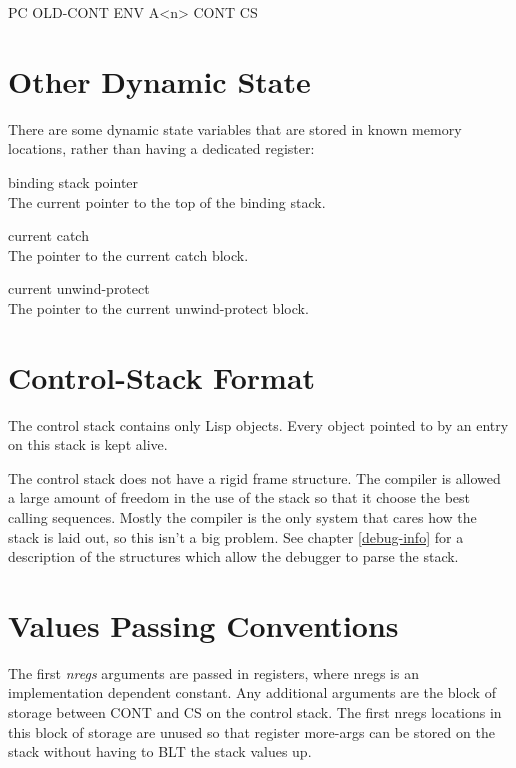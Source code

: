{\begin{itemize, spread 0, spacing 1}
PC
OLD-CONT
ENV
A<n>
CONT
CS


\section{Other Dynamic State}

There are some dynamic state variables that are stored in known memory
locations, rather than having a dedicated register:
\begin{description}
binding stack pointer\\The current pointer to the top of the binding stack.

current catch\\The pointer to the current catch block.

current unwind-protect\\The pointer to the current unwind-protect block.
\end{description}




\section{Control-Stack Format}
\label{Control-Stack-Format}


The control stack contains only Lisp objects.  Every object pointed to by an
entry on this stack is kept alive.

The \rtccl control stack does not have a rigid frame structure.  The compiler
is allowed a large amount of freedom in the use of the stack so that it choose
the best calling sequences.  Mostly the compiler is the only system that cares
how the stack is laid out, so this isn't a big problem.  See chapter
\ref{debug-info} for a description of the structures which allow the debugger
to parse the stack.



\section{Values Passing Conventions}


The first {\it nregs} arguments are passed in registers, where nregs is an
implementation dependent constant.  Any additional arguments are the block of
storage between CONT and CS on the control stack.  The first nregs locations in
this block of storage are unused so that register more-args can be stored on
the stack without having to BLT the stack values up.


\end{itemize, spread 0, spacing 1}}
